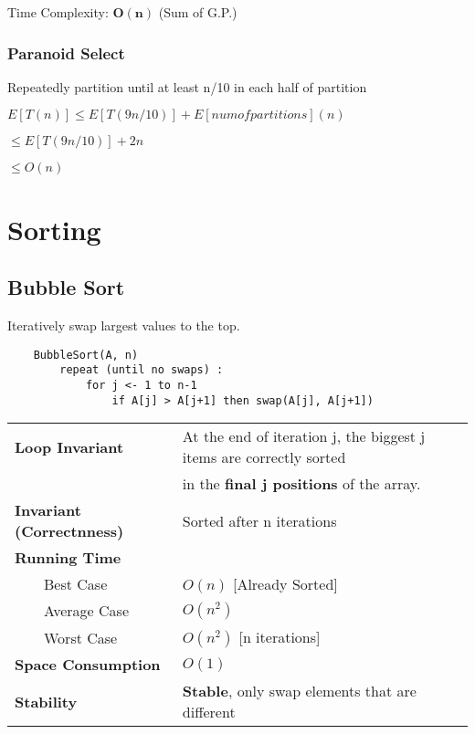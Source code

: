 \documentclass{article}
\newcommand{\tabitem}{~~\llap{\textbullet}~~}
\begin{document}
    \noindent Time Complexity: $\bm{O(n)}$ (Sum of G.P.)

    \subsubsection{Paranoid Select}

    Repeatedly partition until at least n/10 in each half of partition

    $E[T(n)] \leq E[T(9n/10)] + E[num of partitions](n)$

    $\leq E[T(9n/10)] + 2n$

    $\leq O(n)$

    \pagebreak

    \section{Sorting}

    \subsection{Bubble Sort}

    Iteratively swap largest values to the top.

    \begin{verbatim}
    BubbleSort(A, n)
        repeat (until no swaps) :
            for j <- 1 to n-1
                if A[j] > A[j+1] then swap(A[j], A[j+1])

    \end{verbatim}
    
    \begin{tabular}{ll}
        \toprule
        \textbf{Loop Invariant} & At the end of iteration j, the biggest j items are correctly sorted \\
        & in the \textbf{final j positions} of the array.\\
        \midrule
        \textbf{Invariant (Correctnness)} & Sorted after n iterations\\
        \midrule
        \textbf{Running Time} & \\
        \tabitem Best Case & $O(n)$ [Already Sorted]\\
        \tabitem Average Case & $O(n^{2})$\\
        \tabitem Worst Case & $O(n^{2})$ [n iterations]\\
        \midrule
        \textbf{Space Consumption} & $O(1)$\\
        \midrule
        \textbf{Stability} & \textbf{Stable}, only swap elements that are different\\
        \bottomrule
    \end{tabular}
\end{document}
